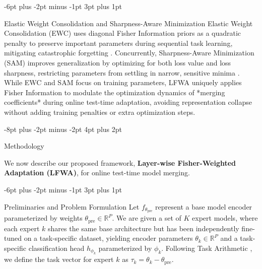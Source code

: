 \documentclass{article}
\makeatletter
\theoremstyle{plain}
\theoremstyle{definition}
\theoremstyle{remark}
\renewcommand{\section}{\@startsection{section}{1}{\z@}%
                       {-8pt plus -2pt minus -2pt}%
                       {4pt plus 2pt}%
                       {\normalfont\large\bfseries\raggedright}}
\renewcommand{\subsection}{\@startsection{subsection}{2}{\z@}%
                          {-6pt plus -2pt minus -1pt}%
                          {3pt plus 1pt}%
                          {\normalfont\normalsize\bfseries\raggedright}}
\makeatother
\begin{document}
\subsection{Elastic Weight Consolidation and Sharpness-Aware Minimization}
Elastic Weight Consolidation (EWC) uses diagonal Fisher Information priors as a quadratic penalty to preserve important parameters during sequential task learning, mitigating catastrophic forgetting \cite{he2025robust,xue2025enhancing,jhajj2025elastic,aslam2024continual,li2020few-shot,baysal2025overcoming,tseng2025incremental,sliogeris2025elastic,liu2025uncertainty-aware,wang2025development}. Concurrently, Sharpness-Aware Minimization (SAM) improves generalization by optimizing for both loss value and loss sharpness, restricting parameters from settling in narrow, sensitive minima \cite{foret2020sharpness-aware,andriushchenko2022towards,li2024friendly,ilbert2024samformer,fan2025towards,luo2025explicit,li2025focal-sam,oikonomou2025sharpness-aware,qu2022generalized}. While EWC and SAM focus on training parameters, LFWA uniquely applies Fisher Information to modulate the optimization dynamics of *merging coefficients* during online test-time adaptation, avoiding representation collapse without adding training penalties or extra optimization steps.

\section{Methodology}
\label{sec:methodology}

We now describe our proposed framework, \textbf{Layer-wise Fisher-Weighted Adaptation (LFWA)}, for online test-time model merging.

\subsection{Preliminaries and Problem Formulation}
Let $f_{\theta_{\text{pre}}}$ represent a base model encoder parameterized by weights $\theta_{\text{pre}} \in \mathbb{R}^P$. We are given a set of $K$ expert models, where each expert $k$ shares the same base architecture but has been independently fine-tuned on a task-specific dataset, yielding encoder parameters $\theta_k \in \mathbb{R}^P$ and a task-specific classification head $h_{\phi_k}$ parameterized by $\phi_k$. Following Task Arithmetic \cite{ilharco2022editing}, we define the task vector for expert $k$ as $\tau_k = \theta_k - \theta_{\text{pre}}$.
\end{document}
